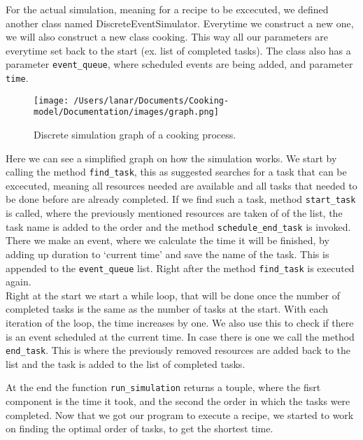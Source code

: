 For the actual simulation, meaning for a recipe to be excecuted, we defined another class named DiscreteEventSimulator. 
Everytime we construct a new one, we will also construct a new class cooking. This way all our parameters are everytime set back to the start (ex. list of completed tasks).
The class also has a parameter \texttt{event\_queue}, where scheduled events are being added, and parameter \texttt{time}. \\

\begin{figure}[H]
    \centerline{\texttt{[image: /Users/lanar/Documents/Cooking-model/Documentation/images/graph.png]}}
    \caption{Discrete simulation graph of a cooking process.}
    \label{fig1}
\end{figure}

Here we can see a simplified graph on how the simulation works. We start by calling the method \texttt{find\_task}, this as suggested searches for a task that can be excecuted, meaning all resources needed are available 
and all tasks that needed to be done before are already completed. If we find such a task, method \texttt{start\_task} is called, where the previously mentioned resources are taken of of the list, the task name is added to the order and the method \texttt{schedule\_end\_task} is invoked. 
There we make an event, where we calculate the time it will be finished, by adding up duration to `current time' and save the name of the task. This is appended to the \texttt{event\_queue} list. Right after the method \texttt{find\_task} is executed again. \\ 

Right at the start we start a while loop, that will be done once the number of completed tasks is the same as the number of tasks at the start. 
With each iteration of the loop, the time increases by one. We also use this to check if there is an event scheduled at the current time. In case there is one we call the method \texttt{end\_task}. 
This is where the previously removed resources are added back to the list and the task is added to the list of completed tasks. 

At the end the function \texttt{run\_simulation} returns a touple, where the fisrt component is the time it took, and the second the order in which the tasks were completed. 
Now that we got our program to execute a recipe, we started to work on finding the optimal order of tasks, to get the shortest time. 

